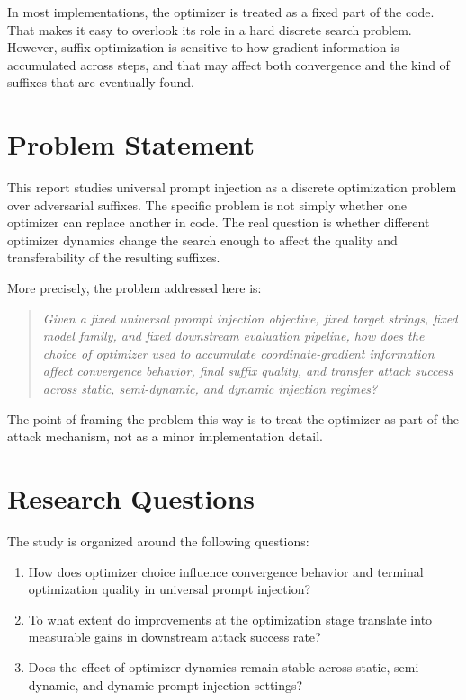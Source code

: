 \documentclass[12pt,a4paper]{report}
\begin{document}
In most implementations, the optimizer is treated as a fixed part of the code. That makes it easy to overlook its role in a hard discrete search problem. However, suffix optimization is sensitive to how gradient information is accumulated across steps, and that may affect both convergence and the kind of suffixes that are eventually found.

\section{Problem Statement}
This report studies universal prompt injection as a discrete optimization problem over adversarial suffixes. The specific problem is not simply whether one optimizer can replace another in code. The real question is whether different optimizer dynamics change the search enough to affect the quality and transferability of the resulting suffixes.

More precisely, the problem addressed here is:

\begin{quote}
\emph{Given a fixed universal prompt injection objective, fixed target strings, fixed model family, and fixed downstream evaluation pipeline, how does the choice of optimizer used to accumulate coordinate-gradient information affect convergence behavior, final suffix quality, and transfer attack success across static, semi-dynamic, and dynamic injection regimes?}
\end{quote}

The point of framing the problem this way is to treat the optimizer as part of the attack mechanism, not as a minor implementation detail.

\section{Research Questions}
The study is organized around the following questions:
\begin{enumerate}[label=\textbf{RQ\arabic*:}]
\item How does optimizer choice influence convergence behavior and terminal optimization quality in universal prompt injection?
\item To what extent do improvements at the optimization stage translate into measurable gains in downstream attack success rate?
\item Does the effect of optimizer dynamics remain stable across static, semi-dynamic, and dynamic prompt injection settings?
\end{enumerate}
\end{document}
